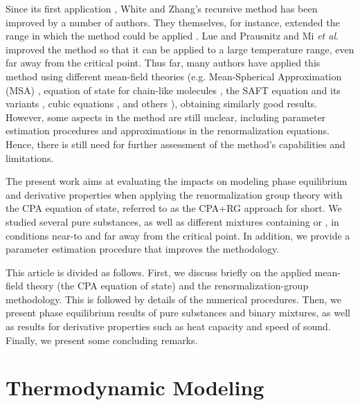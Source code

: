 \documentclass[preprint,12pt,3p]{elsarticle}
\begin{document}
Since its first application \citep{white1993renormalization}, White and Zhang’s recursive method has been improved by a number of authors.
They themselves, for instance, extended the range in which the method could be applied \cite{white1998renormalization}.
Lue and Prausnitz \cite{lue1998renormalization, lue1998brenormalization} and Mi \textit{et al}. \cite{mi2004improved} improved the method so that it can be applied to a large temperature range, even far away from the critical point.
Thus far, many authors have applied this method using different mean-field theories (e.g.
Mean-Spherical Approximation (MSA) \citep{lue1998renormalization}, equation of state for chain-like molecules \cite{jiang1999equation, jiang2000phase}, the SAFT equation and its variants \cite{llovell2004thermodynamic, forte2011application, bymaster2008renormalization, tang2010renormalization, llovell2006global, forte2013application, dias2009thermodynamic, llovell2006second, llovell2006prediction, llovell2007phase}, cubic equations \cite{xu2011prediction,xu2010crossover,pcm2017application,llovell2008accurate,qiu2006vapor,cai2006vapor,cai2004thermodynamics}, and others \cite{ghobadi2013renormalization,choi2016renormalization}), obtaining similarly good results.
However, some aspects in the method are still unclear, including parameter estimation procedures and approximations in the renormalization equations.
Hence, there is still need for further assessment of the method's capabilities and limitations.

The present work aims at evaluating the impacts on modeling phase equilibrium and derivative properties when applying the renormalization group theory with the CPA equation of state, referred to as the CPA+RG approach for short.
We studied several pure substances, as well as different mixtures containing  or , in conditions near-to and far away from the critical point.
In addition, we provide a parameter estimation procedure that improves the methodology.

This article is divided as follows.
First, we discuss briefly on the applied mean-field theory (the CPA equation of state) and the renormalization-group methodology.
This is followed by details of the numerical procedures.
Then, we present phase equilibrium results of pure substances and binary mixtures, as well as results for derivative properties such as heat capacity and speed of sound.
Finally, we present some concluding remarks.

\section{Thermodynamic Modeling}
\end{document}
